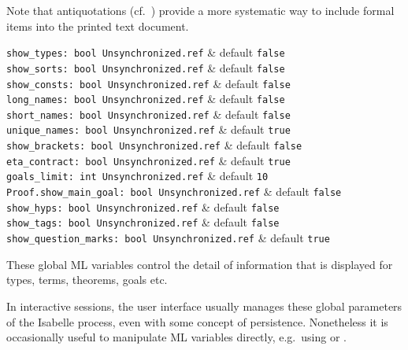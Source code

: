\begin{isabellebody}
\begin{isamarkuptext}
  Note that antiquotations (cf.\ ) provide a more
  systematic way to include formal items into the printed text
  document.%
\end{isamarkuptext}%
\isamarkuptrue%
%
\isamarkuptrue%
%
\begin{isamarkuptext}%
\begin{mldecls} 
    \verb|show_types: bool Unsynchronized.ref| & default \verb|false| \\
    \verb|show_sorts: bool Unsynchronized.ref| & default \verb|false| \\
    \verb|show_consts: bool Unsynchronized.ref| & default \verb|false| \\
    \verb|long_names: bool Unsynchronized.ref| & default \verb|false| \\
    \verb|short_names: bool Unsynchronized.ref| & default \verb|false| \\
    \verb|unique_names: bool Unsynchronized.ref| & default \verb|true| \\
    \verb|show_brackets: bool Unsynchronized.ref| & default \verb|false| \\
    \verb|eta_contract: bool Unsynchronized.ref| & default \verb|true| \\
    \verb|goals_limit: int Unsynchronized.ref| & default \verb|10| \\
    \verb|Proof.show_main_goal: bool Unsynchronized.ref| & default \verb|false| \\
    \verb|show_hyps: bool Unsynchronized.ref| & default \verb|false| \\
    \verb|show_tags: bool Unsynchronized.ref| & default \verb|false| \\
    \verb|show_question_marks: bool Unsynchronized.ref| & default \verb|true| \\
  \end{mldecls}

  These global ML variables control the detail of information that is
  displayed for types, terms, theorems, goals etc.

  In interactive sessions, the user interface usually manages these
  global parameters of the Isabelle process, even with some concept of
  persistence.  Nonetheless it is occasionally useful to manipulate ML
  variables directly, e.g.\ using \hyperlink{command.ML-val}{\mbox{}} or \hyperlink{command.ML-command}{\mbox{}}.


\end{isamarkuptext}
\end{isabellebody}
